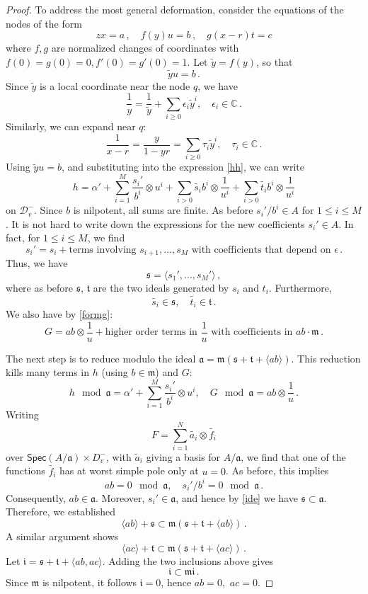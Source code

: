 \documentclass[11pt]{amsart}
\theoremstyle{definition}
\renewcommand{\tilde}{\widetilde}
\begin{document}
{\begin{proof}
To address the most general deformation, consider the equations of the nodes of the form $$zx=a\, , \quad f(y)u=b\, , \quad g(x-r)t=c$$ where $f, g$ are normalized changes of coordinates with $f(0)=g(0)=0, f'(0)=g'(0)=1$. Let $\tilde y=f(y)$, so that $$\tilde y u=b\, .$$ Since $\tilde y$ is a local coordinate near the node $q$, we have $$\frac{1}{y}=\frac{1}{\tilde y}+\sum_{i\geq 0} \epsilon_i \tilde y^i,\quad \epsilon_i\in \mathbb C\,.$$ Similarly, we can expand near $q$: $$\frac{1}{x-r}=\frac{y}{1-yr}=\sum_{i\geq 0} \tau_i \tilde y^i, \quad \tau_i\in \mathbb C\,.$$ Using $\tilde yu=b$, and substituting into the expression \eqref{hh}, we can write $$h=\alpha' + \sum_{i=1}^M \frac{s_i'}{b^i}\otimes u^i+ \sum_{i>0} \tilde {s_i} b^i \otimes \frac{1}{u^i} + \sum_{i> 0} \tilde{t_i} b^i \otimes \frac{1}{u^i}$$ on $\mathcal D_v^-$. Since $b$ is nilpotent, all sums are finite. As before $s_i'/b^i\in A$ for $1\leq i\leq M$. It is not hard to write down the expressions for the new coefficients $s_i'\in A$. In fact, for $1\leq i\leq M$, we find $$s_i'=s_i+\text{terms involving } s_{i+1}, \ldots, s_M \text{ with coefficients that depend on } \epsilon\,.$$ Thus, we have\begin{equation}\label{ide}\mathfrak s=\langle s_1', \ldots, s_M'\rangle\,,\end{equation} where as before $\mathfrak s$, $\mathfrak t$ are the two ideals generated by $s_i$ and $t_i$. 
Furthermore, $$\widetilde {s_i}\in \mathfrak s, \quad \tilde{t_i}\in \mathfrak t\,.$$ We also have by \eqref{formg}: $$G=ab\otimes \frac{1}{u}+ \text {higher order terms in }\frac{1}{u} \text{ with coefficients in }ab\cdot \mathfrak m\,.$$ 

The next step is to reduce modulo the ideal ${\mathfrak a}=\mathfrak m(\mathfrak s+\mathfrak t+\langle ab\rangle).$ This reduction kills many terms in $h$ (using $b\in \mathfrak m$) and $G$: $$h\mod \mathfrak a=\alpha'+ \sum_{i=1}^M \frac{s_i'}{b^i}\otimes u^i, \quad G\mod \mathfrak a=ab\otimes \frac{1}{u}\,.$$ Writing $$F=\sum_{i=1}^{N} \widetilde{a_i} \otimes \widetilde{f_i}$$ over $\textsf{Spec} (A/{\mathfrak a})\times D_v^-$, with $\tilde a_i$ giving a basis for $A/\mathfrak a$, we find that one of the functions $\widetilde{f_i}$ has at worst simple pole only at $u=0$. As before, this implies $$ab=0 \mod \mathfrak a, \quad s_i'/b^i=0\mod \mathfrak a\,.$$ Consequently, $ab\in \mathfrak a$. Moreover, $s_i'\in \mathfrak a$, and hence by \eqref{ide} we have $\mathfrak s\subset \mathfrak a.$ Therefore, we established $$\langle ab\rangle +\mathfrak s\subset \mathfrak m(\mathfrak s+\mathfrak t+\langle ab\rangle)\,.$$ A similar argument shows $$\langle ac\rangle+\mathfrak t\subset \mathfrak m(\mathfrak s+\mathfrak t+\langle ac\rangle)\,.$$ Let $\mathfrak i=\mathfrak s+\mathfrak t+\langle ab,ac\rangle$. Adding the two inclusions above gives $$\mathfrak i\subset \mathfrak m\mathfrak i\,.$$ Since $\mathfrak m$ is nilpotent, it follows $\mathfrak i=0$, hence $ab=0,$ $ac=0$. 


\end{proof}}
\end{document}
